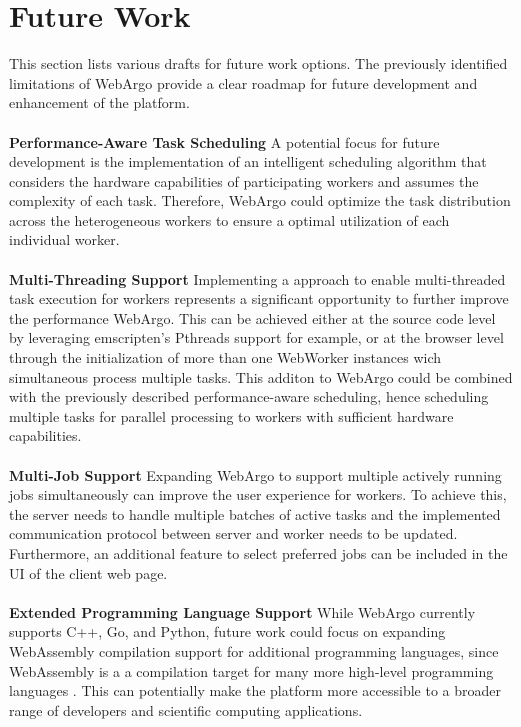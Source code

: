 \section{Future Work}
\label{sec:conclusion:future_work}
This section lists various drafts for future work options. The previously identified limitations of WebArgo provide a clear roadmap for future development and enhancement of the platform.  
\\~\\
\textbf{Performance-Aware Task Scheduling}
\newline
A potential focus for future development is the implementation of an intelligent scheduling algorithm that considers the hardware capabilities of participating workers and assumes the complexity of each task. Therefore, WebArgo could optimize the task distribution across the heterogeneous workers to ensure a optimal utilization of each individual worker.
\\~\\
\textbf{Multi-Threading Support}
\newline
Implementing a approach to enable multi-threaded task execution for workers represents a significant opportunity to further improve the performance WebArgo. This can be achieved either at the source code level by leveraging emscripten's Pthreads support \cite{methodology:emcc} for example, or at the browser level through the initialization of more than one WebWorker instances wich simultaneous process multiple tasks. This additon to WebArgo could be combined with the previously described performance-aware scheduling, hence scheduling multiple tasks for parallel processing to workers with sufficient hardware capabilities.
\\~\\
\textbf{Multi-Job Support}
Expanding WebArgo to support multiple actively running jobs simultaneously can improve the user experience for workers. To achieve this, the server needs to handle multiple batches of active tasks and the implemented communication protocol between server and worker needs to be updated. Furthermore, an additional feature to select preferred jobs can be included in the \ac{UI} of the client web page.  
\\~\\
\textbf{Extended Programming Language Support}
While WebArgo currently supports C++, Go, and Python, future work could focus on expanding WebAssembly compilation support for additional programming languages, since WebAssembly is a a compilation target for many more high-level programming languages \cite{methodology:wasm, methodology:wasmW3C, methodology:wasm2}. This can potentially make the platform more accessible to a broader range of developers and scientific computing applications.
